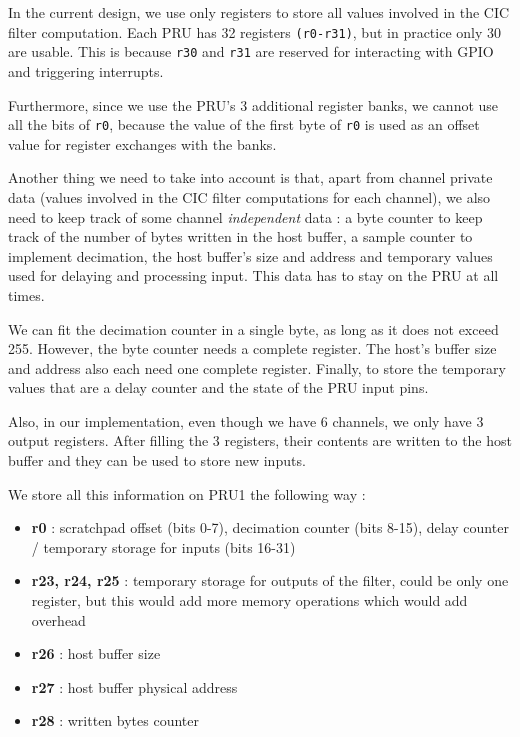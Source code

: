 \documentclass[]{report}
\providecommand{\tightlist}{%
	\setlength{\itemsep}{0pt}\setlength{\parskip}{0pt}}
\begin{document}
In the current design, we use only registers to store all values
involved in the CIC filter computation. Each PRU has 32 registers
\texttt{(r0-r31)}, but in practice only 30 are usable. This is because
\texttt{r30} and \texttt{r31} are reserved for interacting with GPIO and
triggering interrupts.

Furthermore, since we use the PRU's 3 additional register banks, we
cannot use all the bits of \texttt{r0}, because the value of the first
byte of \texttt{r0} is used as an offset value for register exchanges
with the banks.

Another thing we need to take into account is that, apart from channel
private data (values involved in the CIC filter computations for each
channel), we also need to keep track of some channel \emph{independent}
data : a byte counter to keep track of the number of bytes written in
the host buffer, a sample counter to implement decimation, the host
buffer's size and address and temporary values used for delaying and
processing input. This data has to stay on the PRU at all times.

We can fit the decimation counter in a single byte, as long as it does
not exceed 255. However, the byte counter needs a complete register. The
host's buffer size and address also each need one complete register.
Finally, to store the temporary values that are a delay counter and the
state of the PRU input pins.

Also, in our implementation, even though we have 6 channels, we only
have 3 output registers. After filling the 3 registers, their contents
are written to the host buffer and they can be used to store new inputs.

We store all this information on PRU1 the following way :

\begin{itemize}
\tightlist
\item
  \textbf{r0} : scratchpad offset (bits 0-7), decimation counter (bits
  8-15), delay counter / temporary storage for inputs (bits 16-31)
\item
  \textbf{r23, r24, r25} : temporary storage for outputs of the filter,
  could be only one register, but this would add more memory operations
  which would add overhead
\item
  \textbf{r26} : host buffer size
\item
  \textbf{r27} : host buffer physical address
\item
  \textbf{r28} : written bytes counter
\end{itemize}
\end{document}
